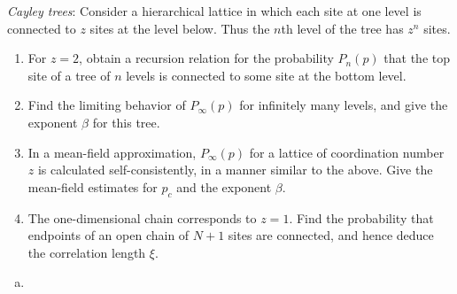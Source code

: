 \begin{problem}
    \textit{Cayley trees}: Consider a hierarchical lattice in which each site at one level is connected to $z$ sites at the level below. Thus the $n$th level of the tree has $z^n$ sites.

    \begin{enumerate}
        \item[(a)] For $z = 2$, obtain a recursion relation for the probability $P_n(p)$ that the top site of a tree of $n$ levels is connected to some site at the bottom level.

        \item[(b)] Find the limiting behavior of $P_\infty(p)$ for infinitely many levels, and give the exponent $\beta$ for this tree.

        \item[(c)] In a mean-field approximation, $P_\infty(p)$ for a lattice of coordination number $z$ is calculated self-consistently, in a manner similar to the above. Give the mean-field estimates for $p_c$ and the exponent $\beta$.

        \item[(d)] The one-dimensional chain corresponds to $z = 1$. Find the probability that endpoints of an open chain of $N + 1$ sites are connected, and hence deduce the correlation length $\xi$.
    \end{enumerate}
\end{problem}

\begin{solution}
    \begin{enumerate}[(a)]
        \item
    \end{enumerate}
\end{solution}

